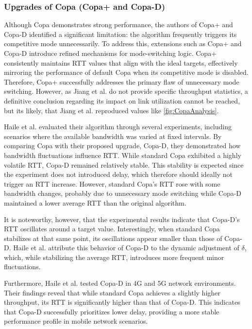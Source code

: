 \subsubsection{Upgrades of Copa (Copa+ and Copa-D)}

Although Copa demonstrates strong performance, the authors of Copa+ and Copa-D identified a significant limitation: the algorithm frequently triggers its competitive mode unnecessarily.  
To address this, extensions such as Copa+ and Copa-D introduce refined mechanisms for mode-switching logic. 
Copa+ consistently maintains \ac{RTT} values that align with the ideal targets, effectively mirroring the performance of default Copa when its competitive mode is disabled. 
Therefore, Copa+ successfully addresses the primary flaw of unnecessary mode switching. 
However, as Jiang et al. do not provide specific throughput statistics, a definitive conclusion regarding its impact on link utilization cannot be reached, but its likely, that Jiang et al. reproduced values like \cref{fig:CopaAnalysis}.

Haile et al. \cite{COPADYNAMIC} evaluated their algorithm through several experiments, including scenarios where the available bandwidth was varied at fixed intervals. 
By comparing Copa with their proposed upgrade, Copa-D, they demonstrated how bandwidth fluctuations influence \ac{RTT}. 
While standard Copa exhibited a highly volatile \ac{RTT}, Copa-D remained relatively stable. 
This stability is expected since the experiment does not introduced delay, which therefore should ideally not trigger an \ac{RTT} increase.
However, standard Copa's \ac{RTT} rose with some bandwidth changes, probably due to unnecessary mode switching while Copa-D maintained a lower average \ac{RTT} than the original algorithm.

It is noteworthy, however, that the experimental results indicate that Copa-D's \ac{RTT} oscillates around a target value. 
Interestingly, when standard Copa stabilizes at that same point, its oscillations appear smaller than those of Copa-D. 
Haile et al. attribute this behavior of Copa-D to the dynamic adjustment of $\delta$, which, while stabilizing the average \ac{RTT}, introduces more frequent minor fluctuations.

Furthermore, Haile et al. tested Copa-D in 4G and 5G network environments. 
Their findings reveal that while standard Copa achieves a slightly higher throughput, its \ac{RTT} is significantly higher than that of Copa-D. 
This indicates that Copa-D successfully prioritizes lower delay, providing a more stable performance profile in mobile network scenarios.

